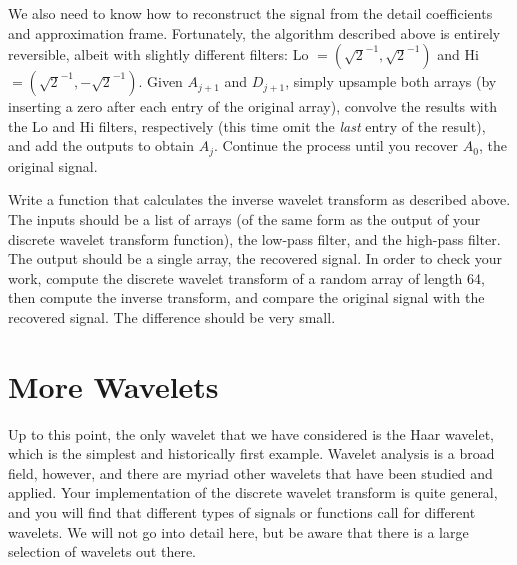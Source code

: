We also need to know how to reconstruct the signal from the detail coefficients and
approximation frame. Fortunately, the algorithm described above is entirely reversible,
albeit with slightly different filters: Lo $= (\sqrt{2}^{-1}, \sqrt{2}^{-1})$ and
Hi $= (\sqrt{2}^{-1}, -\sqrt{2}^{-1})$.
Given $A_{j+1}$ and $D_{j+1}$, simply upsample both arrays (by inserting a zero after
each entry of the original array), convolve the results
with the Lo and Hi filters, respectively (this time omit the \emph{last} entry of the
result), and add the outputs to obtain $A_j$. Continue the
process until you recover $A_0$, the original signal.
\begin{problem}
Write a function that calculates the inverse wavelet transform as described above.
The inputs should be a list of arrays (of the same form as the output of your discrete
wavelet transform function), the low-pass filter, and the high-pass filter. The output
should be a single array, the recovered signal. In order to check your work, compute
the discrete wavelet transform of a random array of length 64, then compute the inverse
transform, and compare the original signal with the recovered signal. The difference
should be very small.
\end{problem}

\section*{More Wavelets}
Up to this point, the only wavelet that we have considered is the Haar wavelet, 
which is the simplest and historically first example. Wavelet analysis is a broad 
field, however, and there are myriad other wavelets that have been studied and 
applied. Your implementation of the discrete wavelet transform is quite general, 
and you will find that different types of signals or functions call for different 
wavelets. We will not go into detail here, but be aware that there is a large 
selection of wavelets out there. 

